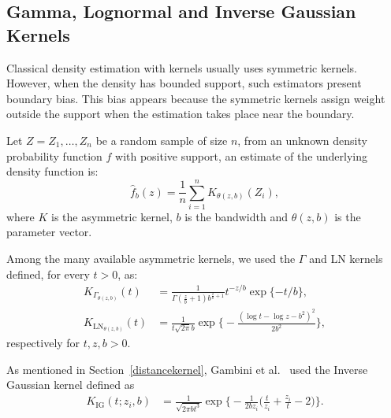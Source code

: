 \documentclass[twocolumn]{svjour3}
\begin{document}
\subsection{Gamma, Lognormal and Inverse Gaussian Kernels}
\label{asymmetrickernel}

Classical density estimation with kernels usually uses symmetric kernels. 
However, when the density has bounded support, such estimators present boundary bias. 
This bias appears because the symmetric kernels assign weight outside the support when the estimation takes place near the boundary.


Let $ Z = Z_1,\dots, Z_n$ be a random sample of size $n$, from an unknown density probability function $f$ with positive support, an estimate of the underlying density function is:
$$
\widehat{f}_b(z)=\frac{1}{n}\sum_{i=1}^n K_{\theta(z,b)}(Z_i),
$$ 
where $K$ is the asymmetric kernel, $b$ is the bandwidth and ${\theta}(z,b)$ is the parameter vector.

Among the many available asymmetric kernels, we used the $\Gamma$ and LN kernels defined, for every $t>0$, as:
\begin{align}
	K_{{\Gamma}_{{\theta}(z,b)}}(t) & =\frac{1}{\Gamma(\frac{z}{b}+1)b^{\frac{z}{b}+1}} t^{-{z}/{b}} \exp\{-{t}/{b}\},
	\label{gammakernel}\\
	K_{{\text{{LN}}}_{{\theta}(z,b)}}(t) & =\frac{1}{t \sqrt{2 \pi} b} \exp\Big\{-\frac{\left(\log t - \log z -b^2\right)^2}{2b^2}\Big\},
	\label{LNkernel}
\end{align}
respectively for $t,z,b>0$.

As mentioned in Section~\ref{distancekernel}, Gambini et al.~\cite{gambini2015} used the Inverse Gaussian kernel defined as
\begin{align}
	K_{\text{IG}}( t; z_i,b) & =\frac{1}{\sqrt{2\pi b t^3}} 
	\exp\Big\{-\frac{1}{2b z_i} \Big(\frac{t}{z_i}+\frac{z_i}{t}-2\Big)\Big\}.
\end{align}
\end{document}
